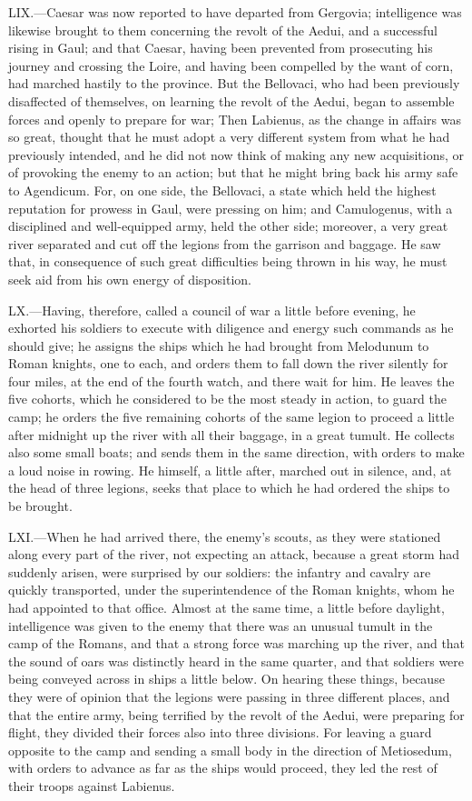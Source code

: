 LIX.—Caesar was now reported to have departed from Gergovia;
intelligence was likewise brought to them concerning the revolt of the
Aedui, and a successful rising in Gaul; and that Caesar, having been
prevented from prosecuting his journey and crossing the Loire, and
having been compelled by the want of corn, had marched hastily to the
province. But the Bellovaci, who had been previously disaffected of
themselves, on learning the revolt of the Aedui, began to assemble
forces and openly to prepare for war; Then Labienus, as the change in
affairs was so great, thought that he must adopt a very different system
from what he had previously intended, and he did not now think of making
any new acquisitions, or of provoking the enemy to an action; but that
he might bring back his army safe to Agendicum. For, on one side, the
Bellovaci, a state which held the highest reputation for prowess in
Gaul, were pressing on him; and Camulogenus, with a disciplined and
well-equipped army, held the other side; moreover, a very great river
separated and cut off the legions from the garrison and baggage. He saw
that, in consequence of such great difficulties being thrown in his way,
he must seek aid from his own energy of disposition.

LX.—Having, therefore, called a council of war a little before evening,
he exhorted his soldiers to execute with diligence and energy such
commands as he should give; he assigns the ships which he had brought
from Melodunum to Roman knights, one to each, and orders them to fall
down the river silently for four miles, at the end of the fourth watch,
and there wait for him. He leaves the five cohorts, which he considered
to be the most steady in action, to guard the camp; he orders the five
remaining cohorts of the same legion to proceed a little after midnight
up the river with all their baggage, in a great tumult. He collects also
some small boats; and sends them in the same direction, with orders to
make a loud noise in rowing. He himself, a little after, marched out in
silence, and, at the head of three legions, seeks that place to which he
had ordered the ships to be brought.

LXI.—When he had arrived there, the enemy's scouts, as they were
stationed along every part of the river, not expecting an attack,
because a great storm had suddenly arisen, were surprised by our
soldiers: the infantry and cavalry are quickly transported, under the
superintendence of the Roman knights, whom he had appointed to that
office. Almost at the same time, a little before daylight, intelligence
was given to the enemy that there was an unusual tumult in the camp of
the Romans, and that a strong force was marching up the river, and that
the sound of oars was distinctly heard in the same quarter, and that
soldiers were being conveyed across in ships a little below. On hearing
these things, because they were of opinion that the legions were passing
in three different places, and that the entire army, being terrified by
the revolt of the Aedui, were preparing for flight, they divided their
forces also into three divisions. For leaving a guard opposite to the
camp and sending a small body in the direction of Metiosedum, with
orders to advance as far as the ships would proceed, they led the rest
of their troops against Labienus.

